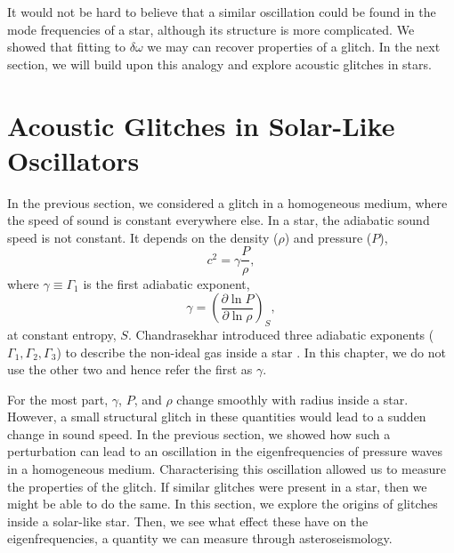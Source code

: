

It would not be hard to believe that a similar oscillation could be found in the mode frequencies of a star, although its structure is more complicated. We showed that fitting to \(\delta\omega\) we may can recover properties of a glitch. In the next section, we will build upon this analogy and explore acoustic glitches in stars.



\section[Glitches in Stars]{Acoustic Glitches in Solar-Like Oscillators}\label{sec:glitch-star}

In the previous section, we considered a glitch in a homogeneous medium, where the speed of sound is constant everywhere else. In a star, the adiabatic sound speed is not constant. It depends on the density (\(\rho\)) and pressure (\(P\)),
%
\begin{equation}
    c^2 = \gamma \frac{P}{\rho},
\end{equation}
%
where \(\gamma \equiv \Gamma_1\) is the first adiabatic exponent,
%
\begin{equation}
    \gamma = \left( \frac{\partial \ln P}{\partial \ln \rho} \right)_S,
\end{equation}
%
at constant entropy, \(S\). Chandrasekhar introduced three adiabatic exponents (\(\Gamma_1,\Gamma_2,\Gamma_3\)) to describe the non-ideal gas inside a star \needcite{}. In this chapter, we do not use the other two and hence refer the first as \(\gamma\).

For the most part, \(\gamma\), \(P\), and \(\rho\) change smoothly with radius inside a star. However, a small structural glitch in these quantities would lead to a sudden change in sound speed. In the previous section, we showed how such a perturbation can lead to an oscillation in the eigenfrequencies of pressure waves in a homogeneous medium. Characterising this oscillation allowed us to measure the properties of the glitch. If similar glitches were present in a star, then we might be able to do the same. In this section, we explore the origins of glitches inside a solar-like star. Then, we see what effect these have on the eigenfrequencies, a quantity we can measure through asteroseismology.

